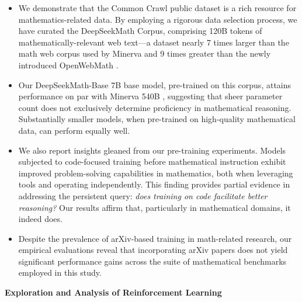\begin{itemize}[topsep=0pt]
    \item We demonstrate that the Common Crawl public dataset is a rich resource for mathematics-related data. By employing a rigorous data selection process, we have curated the DeepSeekMath Corpus, comprising 120B tokens of mathematically-relevant web text—a dataset nearly 7 times larger than the math web corpus used by Minerva \citep{minerva} and 9 times greater than the newly introduced OpenWebMath \citep{openwebmath}.
    
    \item Our DeepSeekMath-Base 7B base model, pre-trained on this corpus, attains performance on par with Minerva 540B \citep{minerva}, suggesting that sheer parameter count does not exclusively determine proficiency in mathematical reasoning. Substantially smaller models, when pre-trained on high-quality mathematical data, can perform equally well.
    
    \item We also report insights gleaned from our pre-training experiments. Models subjected to code-focused training before mathematical instruction exhibit improved problem-solving capabilities in mathematics, both when leveraging tools and operating independently. This finding provides partial evidence in addressing the persistent query: \textit{does training on code facilitate better reasoning?} Our results affirm that, particularly in mathematical domains, it indeed does.
    
    \item Despite the prevalence of arXiv-based training in math-related research, our empirical evaluations reveal that incorporating arXiv papers does not yield significant performance gains across the suite of mathematical benchmarks employed in this study.
\end{itemize}

\textbf{Exploration and Analysis of Reinforcement Learning}

